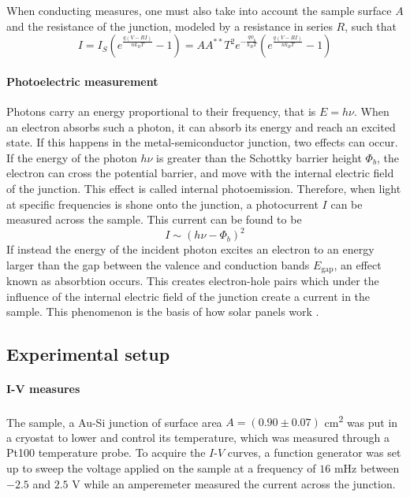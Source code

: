 When conducting measures, one must also take into account the sample surface $A$ and the resistance of the junction, modeled by a resistance in series $R$, such that
\begin{equation} \label{eq:iv_curve}
    I = I_S \left( e^{\frac{q (V- RI)}{n k_B T}} - 1\right) = A A^{**} T^2 e^{-\frac{q\phi_b}{k_BT}} \left( e^{\frac{q (V- RI)}{n k_B T}} - 1\right)
\end{equation}


\paragraph{Photoelectric measurement}
Photons carry an energy proportional to their frequency, that is $E = h \nu$.
When an electron absorbs such a photon, it can absorb its energy and reach an excited state.
If this happens in the metal-semiconductor junction, two effects can occur.
If the energy of the photon $h\nu$ is greater than the Schottky barrier height $\Phi_b$, the electron can cross the potential barrier, and move with the internal electric field of the junction.
This effect is called internal photoemission.
Therefore, when light at specific frequencies is shone onto the junction, a photocurrent $I$ can be measured across the sample.
This current can be found to be \cite{notice}
\begin{equation}
    I \sim (h \nu - \Phi_b)^2
    \label{eq:fowler}
\end{equation}
If instead the energy of the incident photon excites an electron to an energy larger than the gap between the valence and conduction bands $E_\textrm{gap}$, an effect known as absorbtion occurs.
This creates electron-hole pairs which under the influence of the internal electric field of the junction create a current in the sample.
This phenomenon is the basis of how solar panels work \cite{notice}.

\subsection{Experimental setup}
\paragraph{I-V measures}
The sample, a Au-Si junction of surface area $A = (0.90 \pm 0.07)$ \unit{\cm\squared} was put in a cryostat to lower and control its temperature, which was measured through a Pt100 temperature probe.
To acquire the $I$-$V$ curves, a function generator was set up to sweep the voltage applied on the sample at a frequency of $16$ mHz between $-2.5$ and $2.5$ V while an amperemeter measured the current across the junction. 

